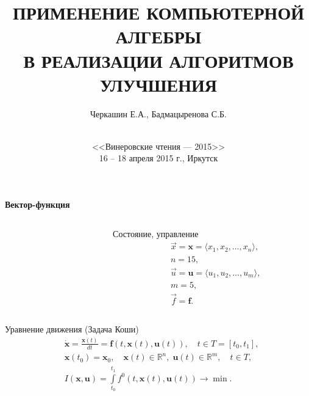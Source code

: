 \documentclass[10pt]{beamer}
\begin{document}
\title[КОМПЬЮТЕРНАЯ АЛГЕБРА В ЗАДАЧАХ ОПТИМИЗАЦИИ]{ПРИМЕНЕНИЕ КОМПЬЮТЕРНОЙ АЛГЕБРЫ\\
В РЕАЛИЗАЦИИ АЛГОРИТМОВ УЛУЧШЕНИЯ}
\author{Черкашин Е.А., Бадмацыренова С.Б.}
\date[2015]{{}\\[1.5cm]
<<Винеровские чтения --- 2015>>\\
16 -- 18 апреля 2015 г.,
Иркутск
}
\maketitle

\begin{frame}{\textbf{Вектор-функция} }
  \begin{columns}[t]
    \begin{column}{0.65\textwidth}\footnotesize
      \def\xyz{$x_1,x_2,x_3,\;x_4,x_5,x_6$} \def\yaw{$x_7,x_8$} \def\pitch{$x_9,x_{10}$}
      \def\roll{$\!\!\!\!\!\!x_{11},x_{12}$} \def\lift{$x_{13}$} \def\down{$\!\!x_{14}$}
      \def\thrust{$u_1$} \def\rudder{$u_5$} \def\drag{$x_{15}$}
      \def\flaps{$u_2$} \def\aeleron{$u_3$} \def\engine{}
      \def\elevator{$u_4$} \def\svgwidth{\columnwidth}
      
    \end{column}
    \begin{column}{0.35\textwidth}
      \begin{block}{Состояние, управление}%
        \vspace{-1.5em}
        \begin{align*}
          &\vec{x}=\mathbf{x}=\langle x_1,x_2,\ldots,x_n\rangle,\\
          &n=15,\\
          &\vec{u}=\mathbf{u}=\langle u_1,u_2,\ldots,u_m\rangle,\\
          &m=5,\\
          &\vec{f}=\mathbf{f}.
        \end{align*}
      \end{block}
    \end{column}
  \end{columns}
\begin{block}{Уравнение движения (Задача Коши)}
  \begin{align*}
&\dot{\mathbf{x}}=\frac{\mathbf{x}(t)}{dt}=\mathbf{f}(t,\mathbf{x}(t),\mathbf{u}(t)),\quad t \in T=[t_0,t_1], \\
&\mathbf{x}(t_0)=\mathbf{x}_0,\quad \mathbf{x}(t)\in \mathbb{R}^n,\; \mathbf{u}(t) \in \mathbb{R}^m,\quad t\in T, \\
&I(\mathbf{x},\mathbf{u})=\int\limits_{t_0}^{t_1}f^0(t,\mathbf{x}(t),\mathbf{u}(t)) \to \min.
  \end{align*}
\end{block}
\end{frame}
\end{document}
